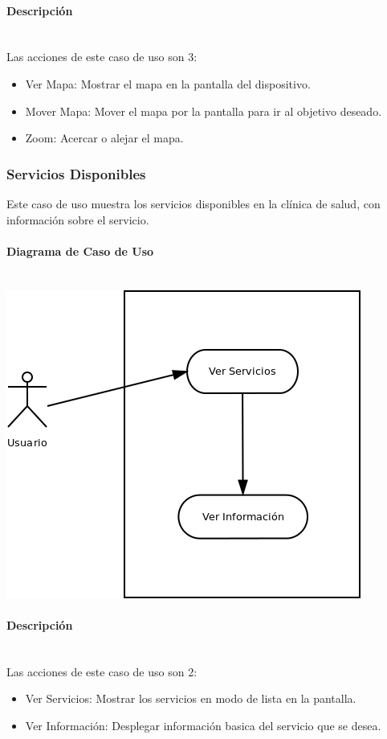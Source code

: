 \documentclass[12pt]{article}
\begin{document}
\paragraph{Descripci\'on}\ \\
Las acciones de este caso de uso son 3:
\begin{itemize}
	\item{Ver Mapa: Mostrar el mapa en la pantalla del dispositivo.}
	\item{Mover Mapa: Mover el mapa por la pantalla para ir al objetivo deseado.}
	\item{Zoom: Acercar o alejar el mapa.}
\end{itemize}

\subsubsection{Servicios Disponibles}
Este caso de uso muestra los servicios disponibles en la cl\'inica de salud, con informaci\'on sobre el servicio.

\paragraph{Diagrama de Caso de Uso}\ \\
\includegraphics[scale=0.6]{"../Documentos/Diagramas/CU2_"}

\paragraph{Descripci\'on}\ \\
Las acciones de este caso de uso son 2:
\begin{itemize}
	\item{Ver Servicios: Mostrar los servicios en modo de lista en la pantalla.}
	\item{Ver Informaci\'on: Desplegar informaci\'on basica del servicio que se desea.}
\end{itemize}
\end{document}
